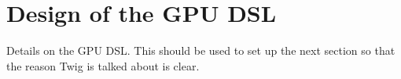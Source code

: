 
\section{Design of the GPU DSL}

Details on the GPU DSL. This should be used to set up the next section so that
the reason Twig is talked about is clear.
